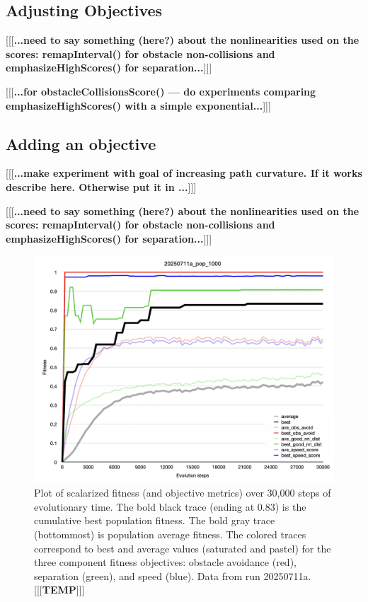 \documentclass[letterpaper]{article}
\begin{document}

\subsection{Adjusting Objectives}
\label{subsec:adjust_objective}

[[[\textbf{...need to say something (here?) about the nonlinearities used on the scores: remapInterval() for obstacle non-collisions and emphasizeHighScores() for separation...}]]]

[[[\textbf{...for obstacleCollisionsScore() --- do experiments comparing emphasizeHighScores() with a simple exponential...}]]]

\subsection{Adding an objective}
\label{subsec:add_objective}

[[[\textbf{...make experiment with goal of increasing path curvature. If it works describe here. Otherwise put it in ...}]]]

[[[\textbf{...need to say something (here?) about the nonlinearities used on the scores: remapInterval() for obstacle non-collisions and emphasizeHighScores() for separation...}]]]


\begin{figure}[t]
    \centering
    \includegraphics[width=\linewidth]{images/temp_fit_plot.png}
    \caption{Plot of scalarized fitness (and objective metrics) over 30,000 steps of evolutionary time. The bold black trace (ending at 0.83) is the cumulative best population fitness. The bold gray trace (bottommost) is population average fitness. The colored traces correspond to best and average values (saturated and pastel) for the three component fitness objectives: obstacle avoidance (red), separation (green), and speed (blue). Data from run 20250711a. [[[\textbf{TEMP}]]]}
    \label{fig:fit_plot}
\end{figure}
\end{document}
